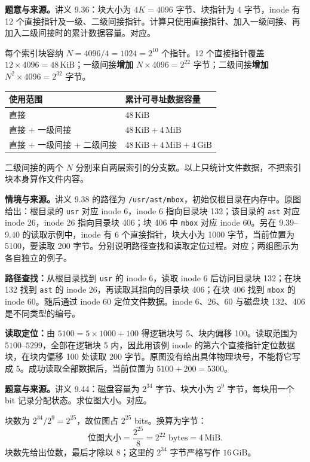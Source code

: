 \textbf{题意与来源。}讲义 9.36：块大小为 $4K=4096$ 字节、块指针为 4 字节，inode 有 12 个直接指针及一级、二级间接指针。计算只使用直接指针、加入一级间接、再加入二级间接时的累计数据容量。对应。

\begin{workedsolution}
每个索引块容纳 $N=4096/4=1024=2^{10}$ 个指针。12 个直接指针覆盖 $12\times4096=48\,\mathrm{KiB}$；一级间接\textbf{增加} $N\times4096=2^{22}$ 字节；二级间接\textbf{增加} $N^2\times4096=2^{32}$ 字节。
\begin{center}
\begin{tabular}{@{}ll@{}}
\toprule
使用范围 & 累计可寻址数据容量 \\
\midrule
直接 & $48\,\mathrm{KiB}$ \\
直接 + 一级间接 & $48\,\mathrm{KiB}+4\,\mathrm{MiB}$ \\
直接 + 一级间接 + 二级间接 & $48\,\mathrm{KiB}+4\,\mathrm{MiB}+4\,\mathrm{GiB}$ \\
\bottomrule
\end{tabular}
\end{center}
二级间接的两个 $N$ 分别来自两层索引的分支数。以上只统计文件数据，不把索引块本身算作文件内容。
\end{workedsolution}

\textbf{情境与来源。}讲义 9.38 的路径为 \texttt{/usr/ast/mbox}，初始仅根目录在内存中。原图给出：根目录的 \texttt{usr} 对应 inode 6，inode 6 指向目录块 132；该目录的 \texttt{ast} 对应 inode 26，inode 26 指向目录块 406；块 406 中 \texttt{mbox} 对应 inode 60。另在 9.39--9.40 的读取示例中，inode 有 6 个直接指针，块大小为 1000 字节，当前位置为 5100，要读取 200 字节。分别说明路径查找和读取定位过程。对应；两组图示为各自独立的例子。

\begin{workedsolution}
\textbf{路径查找：}从根目录找到 \texttt{usr} 的 inode 6，读取 inode 6 后访问目录块 132；在块 132 找到 \texttt{ast} 的 inode 26，再读取其指向的目录块 406；在块 406 找到 \texttt{mbox} 的 inode 60。随后通过 inode 60 定位文件数据。inode 6、26、60 与磁盘块 132、406 是不同类型的编号。

\textbf{读取定位：}由 $5100=5\times1000+100$ 得逻辑块号 5、块内偏移 100。读取范围为 $5100$--$5299$，全部在逻辑块 5 内，因此用该例 inode 的第六个直接指针定位数据块，在块内偏移 100 处读取 200 字节。原图没有给出具体物理块号，不能将它写成 5。成功读取全部数据后，当前位置为 $5100+200=\boxed{5300}$。
\end{workedsolution}

\textbf{题意与来源。}讲义 9.44：磁盘容量为 $2^{34}$ 字节、块大小为 $2^9$ 字节，每块用一个 bit 记录分配状态。求位图大小。对应。

\begin{workedsolution}
块数为 $2^{34}/2^9=2^{25}$，故位图占 $2^{25}$ bits。换算为字节：
\[
  \text{位图大小}=\frac{2^{25}}{8}=2^{22}\text{ bytes}=\boxed{4\,\mathrm{MiB}}.
\]
块数先给出位数，最后才除以 8；这里的 $2^{34}$ 字节严格写作 $16\,\mathrm{GiB}$。
\end{workedsolution}
\endgroup
